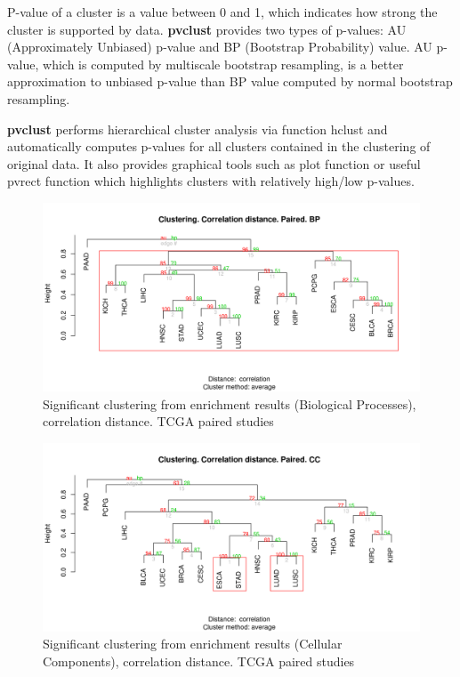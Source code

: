\documentclass[a4paper,12pt]{article}
\begin{document}
P-value of a cluster is a value between 0 and 1, which indicates how strong the cluster is supported by data.
\textbf{pvclust} provides two types of p-values: AU (Approximately Unbiased) p-value and BP (Bootstrap Probability) value. 
AU p-value, which is computed by multiscale bootstrap resampling, is a better approximation to unbiased p-value than BP value 
computed by normal bootstrap resampling.

\textbf{pvclust} performs hierarchical cluster analysis via function hclust and automatically computes p-values 
for all clusters contained in the clustering of original data. It also provides graphical tools such as plot function 
or useful pvrect function which highlights clusters with relatively high/low p-values. 





\begin{figure}[!h] 
\centering 
\includegraphics[width=1\textwidth]{img/sigcluster_corelationd_bp_paired.png} 
\caption{Significant clustering from enrichment results (Biological Processes), correlation distance.  TCGA paired studies} 
\label{figCLUSTsig_corr_bp_paired} 
\end{figure} 

\begin{figure}[!h] 
\centering 
\includegraphics[width=1\textwidth]{img/sigcluster_corelationd_cc_paired.png} 
\caption{Significant clustering from enrichment results (Cellular Components), correlation distance.  TCGA paired studies} 
\label{figCLUSTsig_corr_cc_paired} 
\end{figure} 
\end{document}
